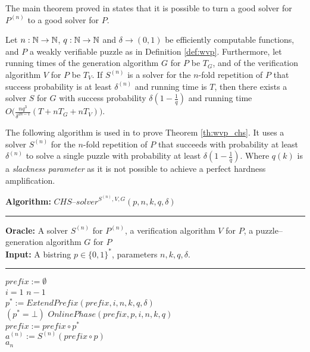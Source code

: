 \documentclass[11pt,a4paper,titlepage]{memoir}
\begin{document}
The main theorem proved in \cite{canetti2004hardness} states that it is possible to turn a good solver for
$P^{(n)}$ to a good solver for $P$.
%
\begin{theorem}
  \label{th:wvp_chs}
Let $n:\mathbb{N} \rightarrow \mathbb{N}$, $q: \mathbb{N} \rightarrow \mathbb{N}$ and $\delta \rightarrow (0,1)$ be efficiently computable functions,
and $P$ a weakly verifiable puzzle as in Definition \ref{def:wvp}.
Furthermore, let running times of the generation algorithm $G$ for $P$ be $T_G$, and of the verification algorithm $V$ for $P$ be $T_V$.
If $S^{(n)}$ is a solver for the $n$-fold repetition of $P$ that success probability is at least $\delta^{(n)}$
and running time is $T$, then there exists a solver $S$ for $G$ with success probability $\delta(1-\frac{1}{q})$ and running time
$O\Big(\frac{nq^3}{\delta^{2n-1}}(T + nT_G + nT_V)\Big)$.
\end{theorem}
%
The following algorithm is used in \cite{canetti2004hardness} to prove Theorem \ref{th:wvp_chs}.
It uses a solver $S^{(n)}$ for the $n$-fold repetition of $P$ that succeeds with probability at least $\delta^{(n)}$
to solve a single puzzle with probability at least $\delta(1  - \frac{1}{q})$.
Where $q(k)$ is a \textit{slackness parameter} as it is not possible to achieve a perfect hardness amplification.
%
\pagebreak
\begin{codeblock}
  \textbf{Algorithm:} $\mathit{CHS\text{--}solver}^{S^{(n)},V,G}(p, n, k, q, \delta)$
  \medskip\hrule
  \textbf{Oracle:} A solver $S^{(n)}$ for $P^{(n)}$, a verification algorithm $V$ for $P$, a puzzle--generation algorithm $G$ for $P$\\
  \textbf{Input:}  A bistring $p \in \{0,1\}^{*}$, parameters $n, k, q, \delta$.
  \medskip\hrule
  $\mathit{prefix} := \emptyset$\\
  \For $i = 1$ \To $n-1$ \Do \\
  \IndI $p^* := \mathit{ExtendPrefix(prefix, i, n, k, q, \delta)}$\\
  \IndI \If $(p^* = \bot)$ \Then \Return $\mathit{OnlinePhase}(\mathit{prefix}, p, i, n, k, q)$ \\
  \IndI \Else $\mathit{prefix} := \mathit{prefix} \circ p^*$\\
  $ a^{(n)} := S^{(n)}(\mathit{prefix} \circ p)$ \\
  \Return $a_n$
\end{codeblock}
%
\end{document}

